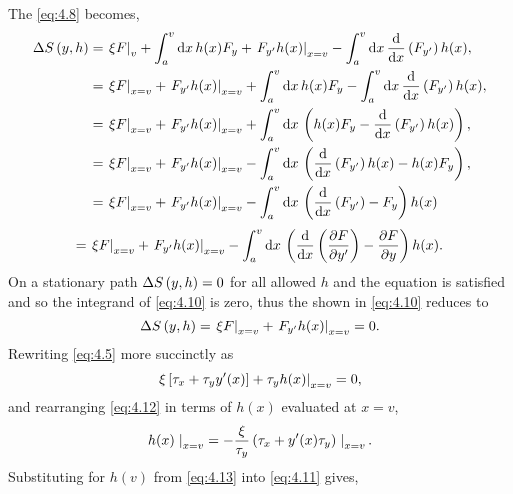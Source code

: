The \gd\; \eqref{eq:4.8} becomes,
\begin{equation*}
\begin{split}
	\Delta S\left(y,h\right) &= \left. \xi F \right|_v + \int_{a}^{v}\mathrm{d} x\, h(x)F_y + \left. F_{y^\prime} h(x)\right|_{x=v}- \int_{a}^{v}\mathrm{d} x\,\frac{\mathrm{d}}{\mathrm{d}x}\left(F_{y^\prime}\right) h(x),\\
&= \left. \xi F \right|_{x=v} + \left. F_{y^\prime} h(x)\right|_{x=v}+ \int_{a}^{v}\mathrm{d} x\, h(x)F_y - \int_{a}^{v}\mathrm{d} x\,\frac{\mathrm{d}}{\mathrm{d}x}\left(F_{y^\prime}\right) h(x),\\
&= \left. \xi F \right|_{x=v} + \left. F_{y^\prime} h(x)\right|_{x=v}+ \int_{a}^{v}\mathrm{d} x\, \left(h(x)F_y - \frac{\mathrm{d}}{\mathrm{d}x}\left(F_{y^\prime}\right) h(x)\right),\\
&= \left. \xi F \right|_{x=v} + \left. F_{y^\prime} h(x)\right|_{x=v}- \int_{a}^{v}\mathrm{d} x\, \left(\frac{\mathrm{d}}{\mathrm{d}x}\left(F_{y^\prime}\right) h(x) - h(x)F_y\right),\\
&= \left. \xi F \right|_{x=v} + \left. F_{y^\prime} h(x)\right|_{x=v}- \int_{a}^{v}\mathrm{d} x\, \left(\frac{\mathrm{d}}{\mathrm{d}x}\left(F_{y^\prime}\right) - F_y\right) h(x)
\end{split}
\end{equation*}
\begin{equation}
\label{eq:4.10}
= \left. \xi F \right|_{x=v} + \left. F_{y^\prime} h(x)\right|_{x=v}- \int_{a}^{v}\mathrm{d} x\, \left(\frac{\mathrm{d}}{\mathrm{d}x}\left(\frac{\partial F}{\partial y^\prime}\right) - \frac{\partial F}{\partial y}\right) h(x).
\end{equation}
On a stationary path $\Delta S\left(y,h\right)=0$ for all allowed $h$ and the \el equation is satisfied and so the integrand of \eqref{eq:4.10} is zero, thus the \gd\;shown in \eqref{eq:4.10} reduces to
\begin{equation}
\label{eq:4.11}
\Delta S\left(y,h\right) = \left. \xi F \right|_{x=v} + \left. F_{y^\prime} h(x)\right|_{x=v} = 0.
\end{equation}
Rewriting \eqref{eq:4.5} more succinctly as
\begin{equation}
	\label{eq:4.12}
	\left.\xi\left[\tau_x + \tau_y y^\prime(x)\right] + \tau_y h(x)\right|_{x=v} = 0,
\end{equation}
and rearranging \eqref{eq:4.12} in terms of $h(x)$ evaluated at $x=v$,
\begin{equation}
	\label{eq:4.13}
	h(x)\left.\right|_{x=v} = -\frac{\xi}{\tau_y}\left(\tau_x +y^\prime(x)\tau_y\right)\left.\right|_{x=v}.
\end{equation}
Substituting for $h(v)$ from \eqref{eq:4.13} into \eqref{eq:4.11} gives,
